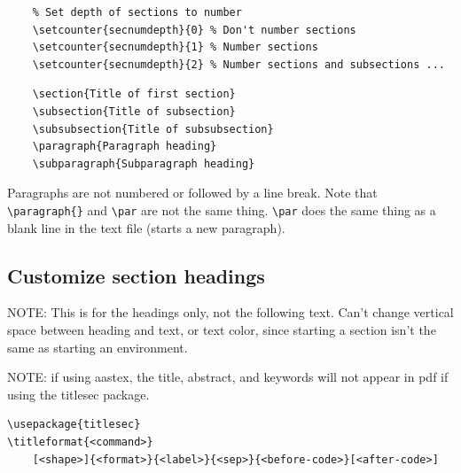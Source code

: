 \documentclass{article}
\begin{document}
\begin{lstlisting}
    % Set depth of sections to number
    \setcounter{secnumdepth}{0} % Don't number sections
    \setcounter{secnumdepth}{1} % Number sections
    \setcounter{secnumdepth}{2} % Number sections and subsections ...
\end{lstlisting}


\begin{minipage}[t]{0.5\textwidth}
\begin{lstlisting}
    \section{Title of first section}
    \subsection{Title of subsection}
    \subsubsection{Title of subsubsection}
    \paragraph{Paragraph heading}
    \subparagraph{Subparagraph heading}
\end{lstlisting}
\end{minipage}%
\begin{minipage}[t]{0.5\textwidth}
Paragraphs are not numbered or followed by a line break.
Note that \verb|\paragraph{}| and \verb|\par| are not the same thing.
\verb|\par| does the same thing as a blank line in the text file (starts a new paragraph).
\end{minipage}


\subsection{Customize section headings}
NOTE: This is for the headings only, not the following text.
Can't change vertical space between heading and text, or text color, since
starting a section isn't the same as starting an environment.

NOTE: if using aastex, the title, abstract, and keywords will not appear in
pdf if using the titlesec package.
\begin{lstlisting}
\usepackage{titlesec}
\titleformat{<command>}
    [<shape>]{<format>}{<label>}{<sep>}{<before-code>}[<after-code>]
\end{lstlisting}
\end{document}
